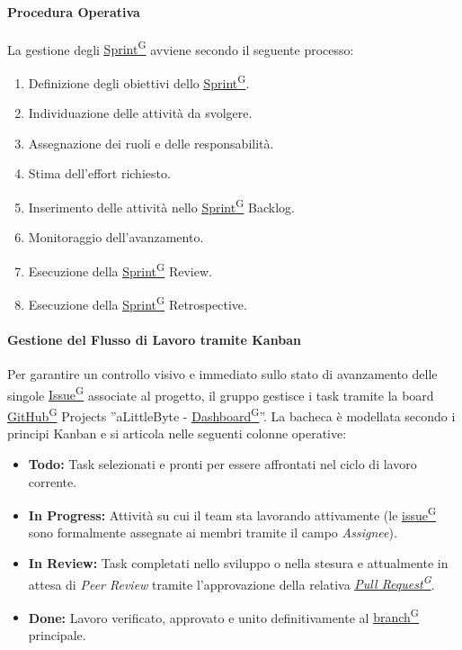 \documentclass[a4paper,12pt]{article}
\providecommand{\glslink}[2]{\href{https://alittlebyte-19.github.io/Documentazione/glossario.html\#gls-#1}{\underline{#2}\textsuperscript{\scriptsize G}}}
\begin{document}
\paragraph{Procedura Operativa}
La gestione degli \glslink{sprint}{Sprint} avviene secondo il seguente processo:

\begin{enumerate}
    \item Definizione degli obiettivi dello \glslink{sprint}{Sprint}.
    \item Individuazione delle attività da svolgere.
    \item Assegnazione dei ruoli e delle responsabilità.
    \item Stima dell'effort richiesto.
    \item Inserimento delle attività nello \glslink{sprint}{Sprint} Backlog.
    \item Monitoraggio dell'avanzamento.
    \item Esecuzione della \glslink{sprint}{Sprint} Review.
    \item Esecuzione della \glslink{sprint}{Sprint} Retrospective.
\end{enumerate}

\paragraph{Gestione del Flusso di Lavoro tramite Kanban}
Per garantire un controllo visivo e immediato sullo stato di avanzamento delle singole \glslink{issue}{Issue} associate al progetto, il gruppo gestisce i task tramite la board \glslink{github}{GitHub} Projects ''aLittleByte - \glslink{dashboard}{Dashboard}''.
La bacheca è modellata secondo i principi Kanban e si articola nelle seguenti colonne operative:
\begin{itemize}
    \item \textbf{Todo:} Task selezionati e pronti per essere affrontati nel ciclo di lavoro corrente.
    \item \textbf{In Progress:} Attività su cui il team sta lavorando attivamente (le \glslink{issue}{issue} sono formalmente assegnate ai membri tramite il campo \textit{Assignee}).
    \item \textbf{In Review:} Task completati nello sviluppo o nella stesura e attualmente in attesa di \textit{Peer Review} tramite l'approvazione della relativa \textit{\glslink{pull-request}{Pull Request}}.
    \item \textbf{Done:} Lavoro verificato, approvato e unito definitivamente al \glslink{branch}{branch} principale.
\end{itemize}
\end{document}
